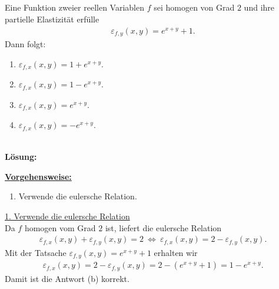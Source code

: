 \subsection*{}
Eine Funktion zweier reellen Variablen $ f $ sei homogen von Grad $ 2 $ und ihre partielle Elastizität erfülle 
\begin{align*}
	\varepsilon_{f,y}(x,y) = e^{x+y} +1. 
\end{align*}
Dann folgt:
\renewcommand{\labelenumi}{(\alph{enumi})}
\begin{enumerate}
	\item 
	$ 	\varepsilon_{f,x}(x,y)  = 1 + e^{x+y}$.
	\item
	$ 	\varepsilon_{f,x}(x,y)  = 1 - e^{x+y}$.
	
	\item
	$ 	\varepsilon_{f,x}(x,y)  =  e^{x+y}$.
	\item
$ 	\varepsilon_{f,x}(x,y)  = - e^{x+y}$.
\end{enumerate}
\ \\
\textbf{Lösung:}
\begin{mdframed}
	\underline{\textbf{Vorgehensweise:}}
	\renewcommand{\labelenumi}{\theenumi.}
	\begin{enumerate}
		\item Verwende die eulersche Relation. 
	\end{enumerate}
\end{mdframed}

\underline{1. Verwende die eulersche Relation}\\
Da $ f $ homogen vom Grad $ 2 $ ist, liefert die eulersche Relation
\begin{align*}
	\varepsilon_{f,x}(x,y) + \varepsilon_{f,y}(x,y) = 2
	\ \Leftrightarrow \
	\varepsilon_{f,x}(x,y) = 2 -  \varepsilon_{f,y}(x,y).
\end{align*}
Mit der Tatsache $ \varepsilon_{f,y}(x,y) = e^{x+y} +1 $ erhalten wir 
\begin{align*}
	\varepsilon_{f,x}(x,y) = 2 -  \varepsilon_{f,y}(x,y)=
	2- (e^{x+y} +1) 
	=
	1 - e^{x+y}. 
\end{align*}
Damit ist die Antwort (b) korrekt.
